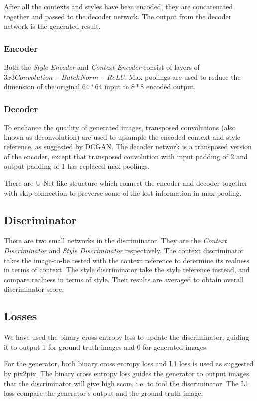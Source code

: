 \documentclass[10pt,twocolumn,letterpaper]{article}
\begin{document}
After all the contexts and styles have been encoded, they are concatenated together and passed to the decoder network. The output from the decoder network is the generated result.

\subsubsection{Encoder}
Both the \textit{Style Encoder} and \textit{Context Encoder} consist of layers of $3x3Convolution - BatchNorm - ReLU$. Max-poolings are used to reduce the dimension of the original $64*64$ input to $8*8$ encoded output. 

\subsubsection{Decoder}
To enchance the quaility of generated images, transposed convolutions (also known as deconvolution) are used to upsample the encoded context and style reference, as suggested by DCGAN\cite{DBLP:journals/corr/RadfordMC15}. The decoder network is a transposed version of the encoder, except that transposed convolution with input padding of 2 and output padding of 1 has replaced max-poolings.

There are U-Net\cite{DBLP:journals/corr/RonnebergerFB15} like structure which connect the encoder and decoder together with skip-connection to preverse some of the lost information in max-pooling.

\subsection{Discriminator}
There are two small networks in the discriminator. They are the  \textit{Context Discriminator} and \textit{Style Discriminator} respectively. The context discriminator takes the image-to-be tested with the context reference to determine its realness in terms of context. The style discriminator take the style reference instead, and compare realness in terms of style. Their results are averaged to obtain overall discriminator score.

\subsection{Losses}
We have used the binary cross entropy loss to update the discriminator, guiding it to output 1 for ground truth images and 0 for generated images. 

For the generator, both binary cross entropy loss and L1 loss is used as suggested by pix2pix. The binary cross entropy loss guides the generator to output images that the discriminator will give high score, i.e. to fool the discriminator. The L1 loss compare the generator's output and the ground truth image.
\end{document}
